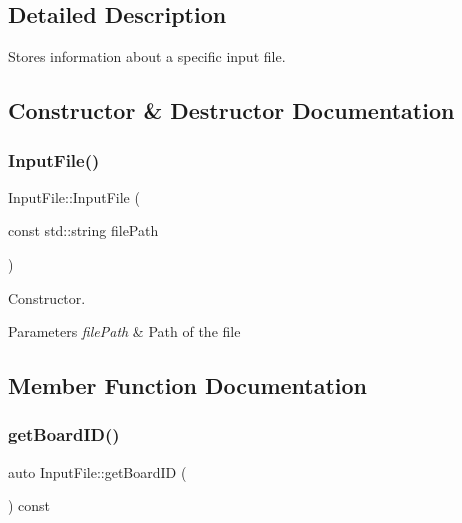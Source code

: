 \subsection{Detailed Description}
Stores information about a specific input file. 

\subsection{Constructor \& Destructor Documentation}
\mbox{\label{class_input_file_a36704203477e78e7de3ff4b98276e3a6}} 
\subsubsection{\texorpdfstring{Input\+File()}{InputFile()}}
{\footnotesize\ttfamily Input\+File\+::\+Input\+File (\begin{DoxyParamCaption}\item[{const std\+::string}]{file\+Path }\end{DoxyParamCaption})}



Constructor. 


\begin{DoxyParams}{Parameters}
{\em file\+Path} & Path of the file \\
\hline
\end{DoxyParams}


\subsection{Member Function Documentation}
\mbox{\label{class_input_file_a340d5150a1c03a07496d0a67580f5c70}} 
\subsubsection{\texorpdfstring{get\+Board\+I\+D()}{getBoardID()}}
{\footnotesize\ttfamily auto Input\+File\+::get\+Board\+ID (\begin{DoxyParamCaption}{ }\end{DoxyParamCaption}) const\hspace{0.3cm}{\ttfamily [inline]}}



